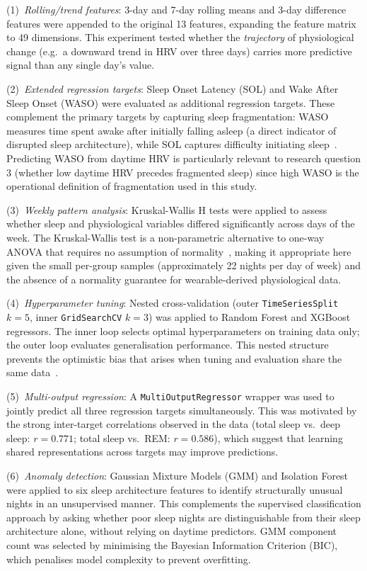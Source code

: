 \documentclass[fleqn,10pt]{wlscirep}
\begin{document}
(1)~\textit{Rolling/trend features}: 3-day and 7-day rolling means and 3-day difference features were appended to the original 13 features, expanding the feature matrix to 49 dimensions. This experiment tested whether the \textit{trajectory} of physiological change (e.g.\ a downward trend in HRV over three days) carries more predictive signal than any single day's value.
 
(2)~\textit{Extended regression targets}: Sleep Onset Latency (SOL) and Wake After Sleep Onset (WASO) were evaluated as additional regression targets. These complement the primary targets by capturing sleep fragmentation: WASO measures time spent awake after initially falling asleep (a direct indicator of disrupted sleep architecture), while SOL captures difficulty initiating sleep~\cite{aasm2017}. Predicting WASO from daytime HRV is particularly relevant to research question 3 (whether low daytime HRV precedes fragmented sleep) since high WASO is the operational definition of fragmentation used in this study.
 
(3)~\textit{Weekly pattern analysis}: Kruskal-Wallis H tests were applied to assess whether sleep and physiological variables differed significantly across days of the week. The Kruskal-Wallis test is a non-parametric alternative to one-way ANOVA that requires no assumption of normality~\cite{kruskal1952}, making it appropriate here given the small per-group samples (approximately 22 nights per day of week) and the absence of a normality guarantee for wearable-derived physiological data.
 
(4)~\textit{Hyperparameter tuning}: Nested cross-validation (outer \texttt{TimeSeriesSplit} $k=5$, inner \texttt{GridSearchCV} $k=3$) was applied to Random Forest and XGBoost regressors. The inner loop selects optimal hyperparameters on training data only; the outer loop evaluates generalisation performance. This nested structure prevents the optimistic bias that arises when tuning and evaluation share the same data~\cite{cawley2010}.
 
(5)~\textit{Multi-output regression}: A \texttt{MultiOutputRegressor} wrapper was used to jointly predict all three regression targets simultaneously. This was motivated by the strong inter-target correlations observed in the data (total sleep vs.\ deep sleep: $r = 0.771$; total sleep vs.\ REM: $r = 0.586$), which suggest that learning shared representations across targets may improve predictions.
 
(6)~\textit{Anomaly detection}: Gaussian Mixture Models (GMM) and Isolation Forest were applied to six sleep architecture features to identify structurally unusual nights in an unsupervised manner. This complements the supervised classification approach by asking whether poor sleep nights are distinguishable from their sleep architecture alone, without relying on daytime predictors. GMM component count was selected by minimising the Bayesian Information Criterion (BIC), which penalises model complexity to prevent overfitting.
\end{document}
